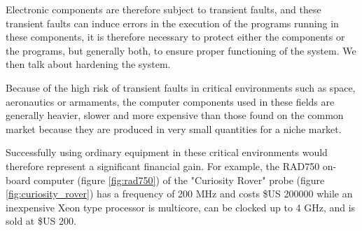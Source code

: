 Electronic components are therefore subject to transient faults, and these transient faults can induce errors in the execution of the programs running in these components, it is therefore necessary to protect either the components or the programs, but generally both, to ensure proper functioning of the system. We then talk about hardening the system.

Because of the high risk of transient faults in critical environments such as space, aeronautics or armaments, the computer components used in these fields are generally heavier, slower and more expensive than those found on the common market because they are produced in very small quantities for a niche market.

Successfully using ordinary equipment in these critical environments would therefore represent a significant financial gain. For example, the RAD750 on-board computer (figure \ref{fig:rad750}) of the "Curiosity Rover" probe (figure \ref{fig:curiosity_rover}) has a frequency of 200 MHz and costs \$US 200000 \cite{john_rhea} while an inexpensive Xeon type processor is multicore, can be clocked up to 4 GHz, and is sold at \$US 200.


